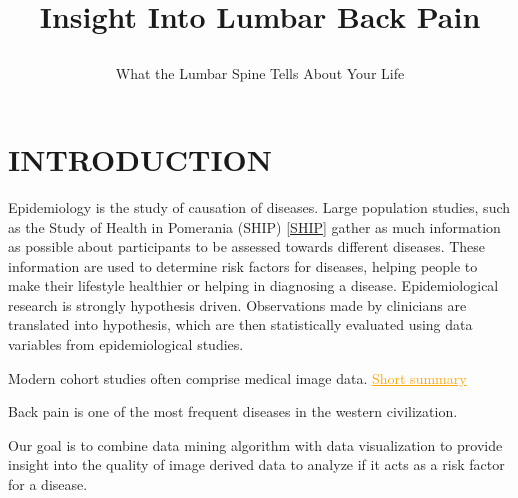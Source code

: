 \documentclass[a4paper,twoside]{style/article}
\newcommand{\com}[1]{\textcolor{orange}{\uline{#1}}}
\begin{document}
\title{Insight Into Lumbar Back Pain  \subtitle{What the Lumbar Spine Tells About Your Life} }

\author{
}



\onecolumn \maketitle \normalsize \vfill

\section{\uppercase{Introduction}}
\label{sec:Introduction}
Epidemiology is the study of causation of diseases.
Large population studies, such as the Study of Health in Pomerania (SHIP) \ref{SHIP} gather as much information as possible about participants to be assessed towards different diseases.
These information are used to determine risk factors for diseases, helping people to make their lifestyle healthier or helping in diagnosing a disease.
Epidemiological research is strongly hypothesis driven.
%
Observations made by clinicians are translated into hypothesis, which are then statistically evaluated using data variables from epidemiological studies.

Modern cohort studies often comprise medical image data.
\com{Short summary}

Back pain is one of the most frequent diseases in the western civilization.

Our goal is to combine data mining algorithm with data visualization to provide insight into the quality of image derived data to analyze if it acts as a risk factor for a disease.
\end{document}
